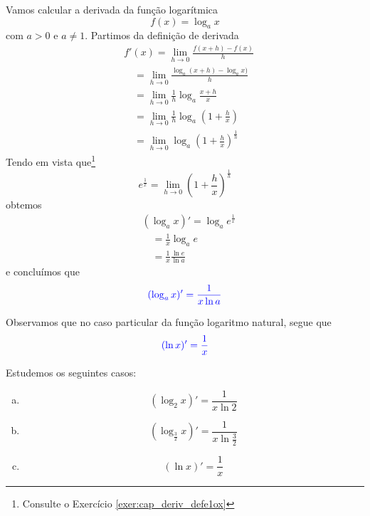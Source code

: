 Vamos calcular a derivada da função logarítmica
\begin{equation}
  f(x) = \log_a x
\end{equation}
com $a>0$ e $a\neq 1$. Partimos da definição de derivada
\begin{align}
  & f'(x) = \lim_{h\to 0}\frac{f(x+h)-f(x)}{h}\\
  & \text{}\quad = \lim_{h\to 0}\frac{\log_a(x+h)-\log_ax)}{h}\\
  & \text{}\quad = \lim_{h\to 0}\frac{1}{h}\log_a\frac{x+h}{x}\\
  & \text{}\quad = \lim_{h\to 0}\frac{1}{h}\log_a\left(1 + \frac{h}{x}\right)\\
  & \text{}\quad = \lim_{h\to 0}\log_a\left(1 + \frac{h}{x}\right)^{\frac{1}{h}}
\end{align}
Tendo em vista que\footnote{Consulte o Exercício \ref{exer:cap_deriv_defe1ox}}
\begin{equation}
  e^{\frac{1}{x}} = \lim_{h\to 0}\left(1 + \frac{h}{x}\right)^{\frac{1}{h}}
\end{equation}
obtemos
\begin{align}
  & (\log_a x)' = \log_a e^{\frac{1}{x}}\\
  & \text{}\quad = \frac{1}{x}\log_a e\\
  & \text{}\quad = \frac{1}{x}\frac{\ln e}{\ln a}
\end{align}
e concluímos que
\begin{equation}
  {\color{blue}(\log_a x)' = \frac{1}{x\ln a}}
\end{equation}

Observamos que no caso particular da função logaritmo natural, segue que
\begin{equation}
  {\color{blue}(\ln x)' = \frac{1}{x}}
\end{equation}

\begin{ex}
  Estudemos os seguintes casos:
  \begin{enumerate}[a)]
  \item
    \begin{equation}
      (\log_2 x)' = \frac{1}{x\ln 2}
    \end{equation}
  \item
    \begin{equation}
      \left(\log_{\frac{3}{2}}x\right)' = \frac{1}{x\ln \frac{3}{2}}
    \end{equation}
  \item
    \begin{equation}
      (\ln x)' = \frac{1}{x}
    \end{equation}
  \end{enumerate}
\end{ex}


